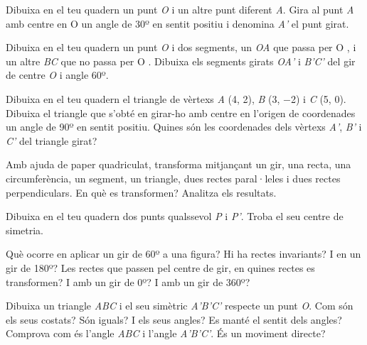 \begin{mylist}
\exer  Dibuixa en el teu quadern un punt \textit{O} i un altre punt diferent \textit{A}. Gira al punt \textit{A} amb centre en  O un angle de 30º en sentit positiu i denomina \textit{A'} el punt girat.

\exer  Dibuixa en el teu quadern un punt \textit{O} i dos segments, un \textit{OA} que passa per\textit{ }O , i un altre \textit{BC} que no passa per O . Dibuixa els segments girats \textit{OA'} i \textit{B'C'} del gir de centre \textit{O} i angle 60º.

\exer[1]  Dibuixa en el teu quadern el triangle de vèrtexs \textit{A} (4, 2), \textit{B} (3, $-$2) i \textit{C} (5, 0). Dibuixa el triangle que s'obté en girar-ho amb centre en l'origen de coordenades un angle de 90º en sentit positiu. Quines són les coordenades dels vèrtexs \textit{A'}, \textit{B'} i \textit{C'} del triangle girat?

\exer  Amb ajuda de paper quadriculat, transforma mitjançant un gir, una recta, una circumferència, un segment, un triangle, dues rectes paral·leles i dues rectes perpendiculars. En què es transformen? Analitza els resultats.



\exer  Dibuixa en el teu quadern dos punts qualssevol \textit{P} i \textit{P'}. Troba el seu centre de simetria.

\exer[1]  Què ocorre en aplicar un gir de 60º a una figura? Hi ha rectes invariants? I en un gir de 180º? Les rectes que passen pel centre de gir, en quines rectes es transformen? I amb un gir de 0º? I amb un gir de 360º?

\exer  Dibuixa un triangle \textit{ABC} i el seu simètric \textit{A'B'C'} respecte un punt \textit{O}. Com són els seus costats? Són iguals? I els seus angles? Es manté el sentit dels angles? Comprova com és l'angle \textit{ABC} i l'angle \textit{A'B'C'}. És un moviment directe?


\end{mylist}
